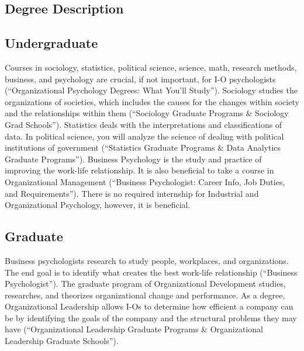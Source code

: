 \begin{multicols}{2}

\section{Degree Description}
    \subsection{Undergraduate}
        Courses in sociology, statistics, political science, science, math, research methods, business, and psychology are crucial, if not important, for I-O psychologists (“Organizational Psychology Degrees: What You’ll Study”). Sociology studies the organizations of societies, which includes the causes for the changes within society and the relationships within them (“Sociology Graduate Programs \& Sociology Grad Schools”). Statistics deals with the interpretations and classifications of data. In political science, you will analyze the science of dealing with political institutions of government (“Statistics Graduate Programs \& Data Analytics Graduate Programs”). Business Psychology is the study and practice of improving the work-life relationship. It is also beneficial to take a course in Organizational Management (“Business Psychologist: Career Info, Job Duties, and Requirements”). There is no required internship for Industrial and Organizational Psychology, however, it is beneficial. 
    \subsection{Graduate}
        Business psychologists research to study people, workplaces, and organizations. The end goal is to identify what creates the best work-life relationship (“Business Psychologist”). The graduate program of Organizational Development studies, researches, and theorizes organizational change and performance. As a degree, Organizational Leadership allows I-Os to determine how efficient a company can be by identifying the goals of the company and the structural problems they may have (“Organizational Leadership Graduate Programs \& Organizational Leadership Graduate Schools”).


\end{multicols}
